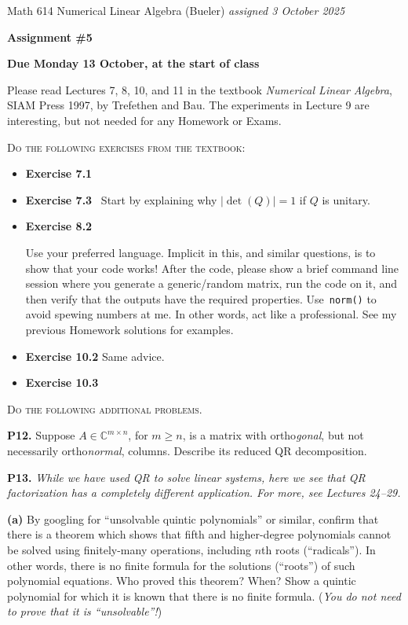 \documentclass[12pt,dvipsnames]{amsart}
\newcommand{\CC}{\mathbb{C}}
\newcommand{\prob}[1]{\bigskip\noindent\textbf{#1.}\quad }
\newcommand{\epart}[1]{\medskip\noindent\textbf{(#1)}\quad }
\begin{document}
\scriptsize \noindent Math 614 Numerical Linear Algebra (Bueler) \hfill \emph{assigned 3 October 2025}
\normalsize\medskip

\Large\centerline{\textbf{Assignment \#5}}
\large
\medskip

\centerline{\textbf{Due Monday 13 October, at the start of class}}
\medskip
\normalsize

\thispagestyle{empty}

\bigskip

\noindent Please read Lectures 7, 8, 10, and 11 in the textbook \emph{Numerical Linear Algebra}, SIAM Press 1997, by Trefethen and Bau.  The experiments in Lecture 9 are interesting, but not needed for any Homework or Exams.

\bigskip
\noindent \textsc{Do the following exercises from the textbook}:

\begin{itemize}[itemsep=4pt]
\item \textbf{Exercise 7.1}
\item \textbf{Exercise 7.3} \quad\, Start by explaining why $|\det(Q)|=1$ if $Q$ is unitary.
\item \textbf{Exercise 8.2} \quad\, \begin{minipage}[t]{0.68\textwidth}  Use your preferred language.  Implicit in this, and similar questions, is to show that your code works!  After the code, please show a brief command line session where you generate a generic/random matrix, run the code on it, and then verify that the outputs have the required properties.  Use \,\texttt{norm()} to avoid spewing numbers at me.  In other words, act like a professional.  See my previous Homework solutions for examples. \end{minipage}
\item \textbf{Exercise 10.2} \quad Same advice.
\item \textbf{Exercise 10.3}
\end{itemize}


\medskip
\noindent \textsc{Do the following additional problems.}

\prob{P12}  Suppose $A\in \CC^{m\times n}$, for $m\ge n$, is a matrix with ortho\emph{gonal}, but not necessarily ortho\emph{normal}, columns.  Describe its reduced QR decomposition.


\prob{P13}  \emph{While we have used QR to solve linear systems, here we see that QR factorization has a completely different application.  For more, see Lectures 24--29.}

\epart{a} By googling for ``unsolvable quintic polynomials'' or similar, confirm that there is a theorem which shows that fifth and higher-degree polynomials cannot be solved using finitely-many operations, including $n$th roots (``radicals'').  In other words, there is no finite formula for the solutions (``roots'') of such polynomial equations.  Who proved this theorem?  When?  Show a quintic polynomial for which it is known that there is no finite formula.  (\emph{You do \emph{not} need to prove that it is ``unsolvable''!})
\end{document}
